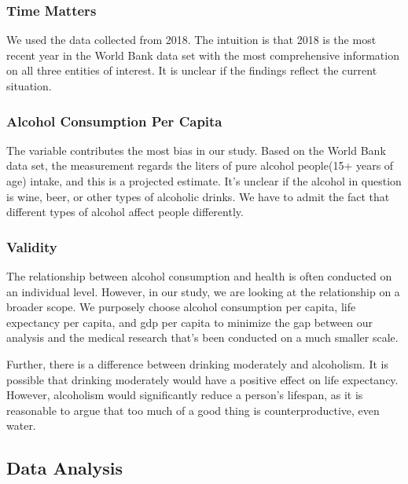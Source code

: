 \documentclass[
]{article}
\begin{document}
\hypertarget{time-matters}{%
\subsubsection{Time Matters}\label{time-matters}}

We used the data collected from 2018. The intuition is that 2018 is the
most recent year in the World Bank data set with the most comprehensive
information on all three entities of interest. It is unclear if the
findings reflect the current situation.

\hypertarget{alcohol-consumption-per-capita}{%
\subsubsection{Alcohol Consumption Per
Capita}\label{alcohol-consumption-per-capita}}

The variable contributes the most bias in our study. Based on the World
Bank data set, the measurement regards the liters of pure alcohol
people(15+ years of age) intake, and this is a projected estimate. It's
unclear if the alcohol in question is wine, beer, or other types of
alcoholic drinks. We have to admit the fact that different types of
alcohol affect people differently.

\hypertarget{validity}{%
\subsubsection{Validity}\label{validity}}

The relationship between alcohol consumption and health is often
conducted on an individual level. However, in our study, we are looking
at the relationship on a broader scope. We purposely choose alcohol
consumption per capita, life expectancy per capita, and gdp per capita
to minimize the gap between our analysis and the medical research that's
been conducted on a much smaller scale.

Further, there is a difference between drinking moderately and
alcoholism. It is possible that drinking moderately would have a
positive effect on life expectancy. However, alcoholism would
significantly reduce a person's lifespan, as it is reasonable to argue
that too much of a good thing is counterproductive, even water.

\hypertarget{data-analysis}{%
\subsection{Data Analysis}\label{data-analysis}}
\end{document}
